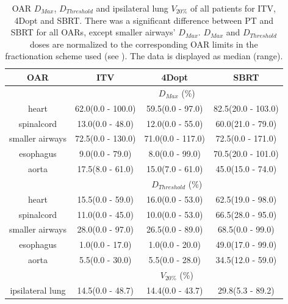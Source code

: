 \begin{table}[H]
	\centering
	\caption{OAR $D_{Max}$, $D_{Threshold}$ and ipsilateral lung $V_{20\%}$ of all patients for ITV, 4Dopt and SBRT. There was a significant difference between PT and SBRT for all OARs, except
	smaller airways' $D_{Max}$. $D_{Max}$ and $D_{Threshold}$ doses are normalized to the corresponding OAR limits in the fractionation scheme used (see \cite{Benedict2010}). 
	The data is displayed as median (range).}
	\begin{tabular}{|c|c|c|c|}
		\hline\hline
		 
		OAR &  ITV & 4Dopt & SBRT \\
		\hline
		& \multicolumn{3}{c|}{$D_{Max}$ (\%)}  \\
		\hline
heart        & 62.0(0.0 - 100.0) & 59.5(0.0 - 97.0) & 82.5(20.0 - 103.0)\\ 
spinalcord    & 13.0(0.0 - 48.0) & 12.0(0.0 - 55.0) & 60.0(21.0 - 79.0)\\ 
smaller airways & 72.5(0.0 - 130.0) & 71.0(0.0 - 117.0) & 72.5(0.0 - 171.0)\\ 
esophagus      & 9.0(0.0 - 79.0) & 8.0(0.0 - 99.0) & 70.5(20.0 - 101.0)\\ 
aorta         & 17.5(8.0 - 61.0) & 15.0(7.0 - 61.0) & 45.0(15.0 - 74.0)\\ 
\hline\hline
& \multicolumn{3}{c}{$D_{Threshold}$ (\%)} \\
\hline
heart & 15.5(0.0 - 59.0) & 16.0(0.0 - 53.0) & 62.5(19.0 - 98.0)\\ 
spinalcord & 11.0(0.0 - 45.0) & 10.0(0.0 - 53.0) & 66.5(28.0 - 95.0)\\ 
smaller airways & 28.0(0.0 - 97.0) & 26.5(0.0 - 89.0) & 68.5(0.0 - 99.0)\\ 
esophagus & 1.0(0.0 - 17.0) & 1.0(0.0 - 20.0) & 49.0(17.0 - 99.0)\\ 
aorta & 5.5(0.0 - 30.0) & 5.5(0.0 - 28.0) & 34.5(12.0 - 59.0)\\ 
\hline\hline
& \multicolumn{3}{c}{$V_{20\%}$ (\%)} \\
\hline
ipsilateral lung & 14.5(0.0 - 48.7) & 14.4(0.0 - 43.7) & 29.8(5.3 - 89.2)\\ 
\hline\hline
	\end{tabular}
	\label{tab:OARComplex}
\end{table}

